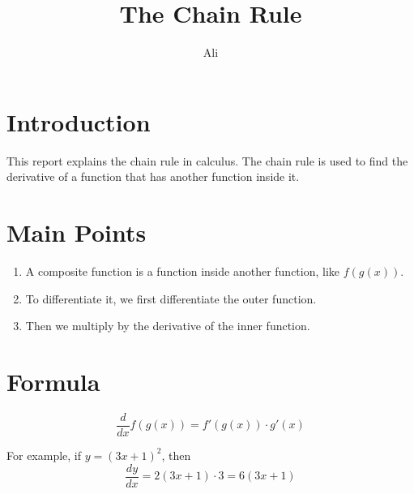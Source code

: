 \documentclass{article}
\title{The Chain Rule}
\author{Ali}
\date{}
\begin{document}
\maketitle

\section{Introduction}

This report explains the chain rule in calculus. The chain rule is used to find the derivative of a function that has another function inside it.

\section{Main Points}

\begin{enumerate}
    \item A composite function is a function inside another function, like $f(g(x))$.
    \item To differentiate it, we first differentiate the outer function.
    \item Then we multiply by the derivative of the inner function.
\end{enumerate}

\section{Formula}

\[
\frac{d}{dx} f(g(x)) = f'(g(x)) \cdot g'(x)
\]

For example, if $y = (3x + 1)^2$, then
\[
\frac{dy}{dx} = 2(3x + 1) \cdot 3 = 6(3x + 1)
\]
\end{document}
